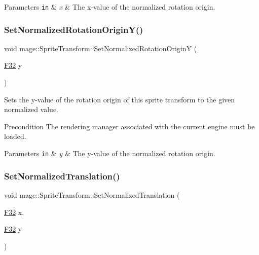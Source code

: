\begin{DoxyParams}[1]{Parameters}
\mbox{\tt in}  & {\em x} & The x-\/value of the normalized rotation origin. \\
\hline
\end{DoxyParams}
\hypertarget{classmage_1_1_sprite_transform_ab940629ca5a67e28fa470800bcef705d}{}\label{classmage_1_1_sprite_transform_ab940629ca5a67e28fa470800bcef705d} 
\subsubsection{\texorpdfstring{Set\+Normalized\+Rotation\+Origin\+Y()}{SetNormalizedRotationOriginY()}}
{\footnotesize\ttfamily void mage\+::\+Sprite\+Transform\+::\+Set\+Normalized\+Rotation\+OriginY (\begin{DoxyParamCaption}\item[{\hyperlink{namespacemage_aa97e833b45f06d60a0a9c4fc22ae02c0}{F32}}]{y }\end{DoxyParamCaption})}

Sets the y-\/value of the rotation origin of this sprite transform to the given normalized value.

\begin{DoxyPrecond}{Precondition}
The rendering manager associated with the current engine must be loaded. 
\end{DoxyPrecond}

\begin{DoxyParams}[1]{Parameters}
\mbox{\tt in}  & {\em y} & The y-\/value of the normalized rotation origin. \\
\hline
\end{DoxyParams}
\hypertarget{classmage_1_1_sprite_transform_a954e7a562a7c68ef402881dc982529ba}{}\label{classmage_1_1_sprite_transform_a954e7a562a7c68ef402881dc982529ba} 
\subsubsection{\texorpdfstring{Set\+Normalized\+Translation()}{SetNormalizedTranslation()}\hspace{0.1cm}{\footnotesize\ttfamily [1/3]}}
{\footnotesize\ttfamily void mage\+::\+Sprite\+Transform\+::\+Set\+Normalized\+Translation (\begin{DoxyParamCaption}\item[{\hyperlink{namespacemage_aa97e833b45f06d60a0a9c4fc22ae02c0}{F32}}]{x,  }\item[{\hyperlink{namespacemage_aa97e833b45f06d60a0a9c4fc22ae02c0}{F32}}]{y }\end{DoxyParamCaption})}

